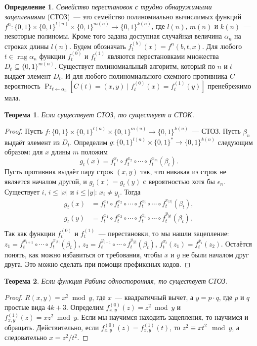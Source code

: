 \documentclass[12pt,a4paper]{article}
\newcommand{\bits}{\{0,1\}}
\DeclareMathOperator{\rng}{rng}
\theoremstyle{definition}
\newtheorem{definition}{Определение}[section]
\theoremstyle{plain}
\newtheorem{theorem}{Теорема}[section]
\theoremstyle{remark}
\begin{document}
\begin{definition}
\emph{Семейство перестановок с трудно обнаружимыми зацеплениями}
(СТОЗ)~--- это семейство полиномиально вычислимых функций
$f^n:\bits\times \bits^{l(n)}\times \bits^{m(n)}\to\bits^{k(n)}$, где $l(n)$, $m(n)$ и $k(n)$~--- некоторые полиномы. Кроме того задана доступная 
случайная величина $\alpha_n$ на строках длины $l(n)$.
Будем обозначать $f^{(b)}_t(x) = f^n(b,t,x)$.
Для любого $t\in\rng \alpha_n$ функции $f^{(0)}_t$ и
$f^{(1)}_t$ являются перестановками множества $D_t\subseteq \bits^{m(n)}$. Существует полиномиальный алгоритм, который
по $n$ и $t$ выдаёт элемент $D_t$.
И для любого полиномиального схемного противника $C$ вероятность
$\Pr_{t\gets \alpha_n}[C(t)=(x,y)\mid f^{(0)}_t(x) = f^{(1)}_t(y)]$ пренебрежимо мала. 
\end{definition}

\begin{theorem}
Если существует СТОЗ, то существует и СТОК.
\end{theorem}
\begin{proof}
Пусть $f:\bits\times \bits^{l(n)}\times \bits^{m(n)}\to\bits^{k(n)}$~--- СТОЗ.
Пусть $\beta_n$ выдаёт элемент из $D_t$. Определим 
$g:\bits^{l(n)}\times \bits^{*}\to\bits^{k(n)}$ следующим
образом: для $x$ длины $m$ положим 
$$g_t(x) = f_t^{x_1}\circ f_t^{x_2}\circ \dotsb \circ f_t^{x_m}(\beta_t).$$
Пусть противник выдаёт пару строк $(x,y)$ так,
что никакая из строк не является началом другой, и
$g_t(x) = g_t(y)$ с вероятностью хотя бы $\epsilon_n$.
Существует $i$, $i\le |x|$ и $i\le|y|$: $x_i\neq y_i$. Тогда
$$
\begin{aligned}
g_t(x) &= f_t^{x_1}\circ f_t^{x_2}\circ \dotsb 
\circ f_t^{x_i} \circ \dotsb \circ f_t^{x_{|x|}}(\beta_t),\\
g_t(y) &= f_t^{x_1}\circ f_t^{x_2}\circ \dotsb 
\circ f_t^{\bar x_i} \circ \dotsb \circ f_t^{y_{|y|}}(\beta_t),\\
\end{aligned}$$
Так как функции $f_t^{(0)}$ и $f_t^{(1)}$~--- перестановки, то
мы нашли зацепление: $z_1 = f_t^{x_{i+1}}\circ \dotsb \circ f_t^{x_{|x|}}(\beta_t)$, $z_2 = f_t^{y_{i+1}}\circ \dotsb \circ f_t^{y_{|y|}}(\beta_t)$, $f^{x_i}_t(z_1) = f^{\bar x_i}_t(z_2)$.
Остаётся понять, как можно избавиться от требования, 
чтобы $x$ и $y$ не были началом друг друга. Это можно сделать при помощи префиксных кодов. 
\end{proof}

\begin{theorem}
Если функция Рабина односторонняя, то существует СТОЗ.
\end{theorem}
\begin{proof}
$R(x,y) = x^2 \bmod y$, где $x$~--- квадратичный вычет,
а $y = p\cdot q$, где $p$ и $q$ простые вида $4k+3$.
Определим $f^{(0)}_{x,y}(z) = z^2\bmod y$ и
$f^{(1)}_{x,y}(z) = xz^2\bmod y$. Если мы научимся
находить зацепления, то научимся и обращать. Действительно,
если $f^{(0)}_{x,y}(z) = f^{(1)}_{x,y}(t)$, то $z^2 \equiv xt^2 \mod y$, а следовательно $x = z^2 / t^2$.
\end{proof}
\end{document}
